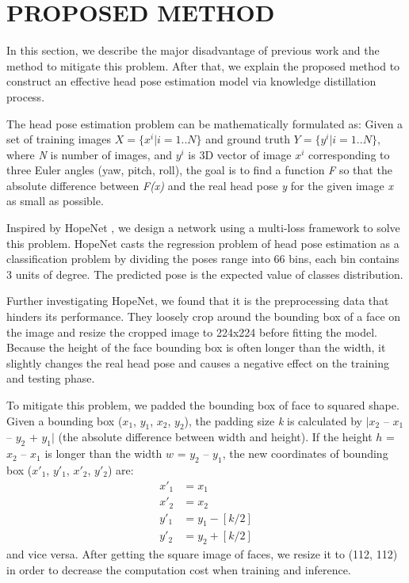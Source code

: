 \documentclass[a4paper,twoside]{article}
\begin{document}
\section{\uppercase{Proposed Method}}
In this section, we describe the major disadvantage of previous work and the method to mitigate this problem. After that, we explain the proposed method to construct an effective head pose estimation model via knowledge distillation process.

The head pose estimation problem can be mathematically formulated as: Given a set of training images \textit{$X = \{x^i | i = 1..N\}$} and ground truth \textit{$Y = \{y^i | i = 1..N\}$}, where \textit{N} is number of images, and \textit{$y^i$} is 3D vector of image \textit{$x^i$} corresponding to three Euler angles (yaw, pitch, roll), the goal is to find a function \textit{F} so that the absolute difference between \textit{F(x)} and the real head pose \textit{y} for the given image \textit{x} as small as possible.

Inspired by HopeNet \cite{ruiz2018fine}, we design a network using a multi-loss framework to solve this problem. HopeNet casts the regression problem of head pose estimation as a classification problem by dividing the poses range into 66 bins, each bin contains 3 units of degree. The predicted pose is the expected value of classes distribution.

Further investigating  HopeNet, we found that it is the preprocessing data that hinders its performance. They loosely crop around the bounding box of a face on the image and resize the cropped image to 224x224 before fitting the model. Because the height of the face bounding box is often longer than the width, it slightly changes the real head pose and causes a negative effect on the training and testing phase.

To mitigate this problem, we padded the bounding box of face to squared shape. Given a bounding box ($x_{1}$, $y_{1}$, $x_{2}$, $y_{2}$), the padding size \textit{k} is calculated by $|x_{2}$ – $x_{1}$ – $y_{2}$ + $y_{1}|$ (the absolute difference between width and height). If the height $h$ = $x_{2}$ – $x_{1}$ is longer than the width $w$ = $y_{2}$ – $y_{1}$, the new coordinates of bounding box ($x'_{1}$, $y'_{1}$, $x'_{2}$, $y'_{2}$) are:
\begin{align*}
    x'_{1} &= x_{1} \\
    x'_{2} &= x_{2} \\
    y'_{1} &= y_{1} - [k/2] \\
    y'_{2} &= y_{2} + [k/2]
\end{align*}
and vice versa. After getting the square image of faces, we resize it to (112, 112) in order to decrease the computation cost when training and inference.
\end{document}
